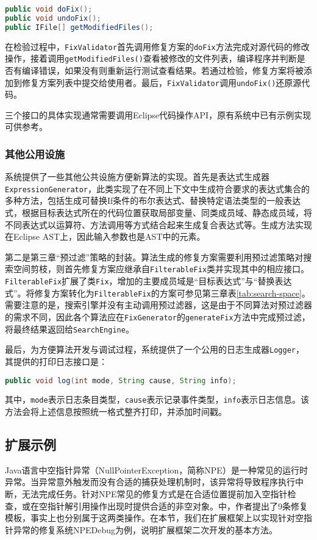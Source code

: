 \begin{lstlisting}[frame=single,language=Java,basicstyle=\ttfamily\footnotesize,tabsize=2]
public void doFix();
public void undoFix();
public IFile[] getModifiedFiles();
\end{lstlisting}

在检验过程中，\texttt{FixValidator}首先调用修复方案的\texttt{doFix}方法完成对源代码的修改操作，接着调用\texttt{getModifiedFiles()}查看被修改的文件列表，编译程序并判断是否有编译错误，如果没有则重新运行测试查看结果。若通过检验，修复方案将被添加到修复方案列表中提交给使用者。最后，\texttt{FixValidator}调用\texttt{undoFix()}还原源代码。

三个接口的具体实现通常需要调用Eclipse代码操作API，原有系统中已有示例实现可供参考。

\subsubsection{其他公用设施}%
系统提供了一些其他公共设施方便新算法的实现。首先是表达式生成器\texttt{ExpressionGenerator}，此类实现了在不同上下文中生成符合要求的表达式集合的多种方法，包括生成可替换If条件的布尔表达式、替换特定语法类型的一般表达式，根据目标表达式所在的代码位置获取局部变量、同类成员域、静态成员域，将不同表达式以运算符、方法调用等方式结合起来生成复合表达式等。生成方法实现在Eclipse AST上，因此输入参数也是AST中的元素。

第二是第三章“预过滤”策略的封装。算法生成的修复方案需要利用预过滤策略对搜索空间剪枝，则首先修复方案应继承自\texttt{FilterableFix}类并实现其中的相应接口。\texttt{FilterableFix}扩展了类\texttt{Fix}，增加的主要成员域是“目标表达式”与“替换表达式”。将修复方案转化为\texttt{FilterableFix}的方案可参见第三章表\ref{tab:search-space}。需要注意的是，搜索引擎并没有主动调用预过滤器，这是由于不同算法对预过滤器的需求不同，因此各个算法应在\texttt{FixGenerator}的\texttt{generateFix}方法中完成预过滤，将最终结果返回给\texttt{SearchEngine}。

最后，为方便算法开发与调试过程，系统提供了一个公用的日志生成器\texttt{Logger}，其提供的打印日志接口是：
\begin{lstlisting}[frame=single,language=Java,basicstyle=\ttfamily\footnotesize,tabsize=2]
public void log(int mode, String cause, String info);
\end{lstlisting}

其中，\texttt{mode}表示日志条目类型，\texttt{cause}表示记录事件类型，\texttt{info}表示日志信息。该方法会将上述信息按照统一格式整齐打印，并添加时间戳。

\subsection{扩展示例}
Java语言中空指针异常（NullPointerException，简称NPE）是一种常见的运行时异常。当异常意外触发而没有合适的捕获处理机制时，该异常将导致程序执行中断，无法完成任务。针对NPE常见的修复方式是在合适位置提前加入空指针检查，或在空指针解引用操作出现时提供合适的非空对象。\cite{DBLP:journals/corr/CornuDSM15}中，作者提出了9条修复模板，事实上也分别属于这两类操作。在本节，我们在扩展框架上以实现针对空指针异常的修复系统NPEDebug为例，说明扩展框架二次开发的基本方法。

